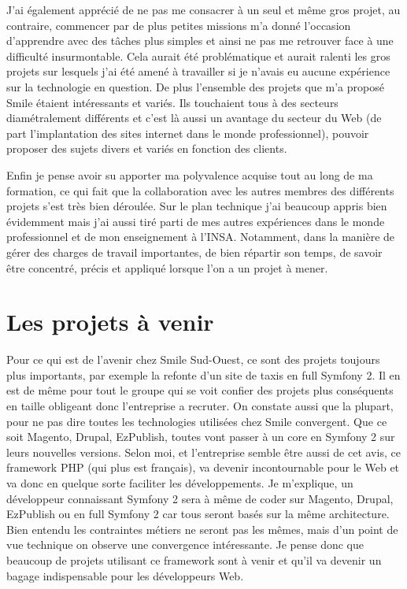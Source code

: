 \documentclass[a4paper,11pt,twoside]{report}
\begin{document}
  J'ai également apprécié de ne pas me consacrer à un seul et même gros projet, au contraire, commencer par de plus petites missions m'a donné l'occasion d'apprendre avec des tâches plus simples et ainsi ne pas me retrouver face à une difficulté insurmontable. Cela aurait été problématique et aurait ralenti les gros projets sur lesquels j'ai été amené à travailler si je n'avais eu aucune expérience sur la technologie en question. De plus l'ensemble des projets que m'a proposé Smile étaient intéressants et variés. Ils touchaient tous à des secteurs diamétralement différents et c'est là aussi un avantage du secteur du Web (de part l'implantation des sites internet dans le monde professionnel), pouvoir proposer des sujets divers et variés en fonction des clients.
  
  Enfin je pense avoir su apporter ma polyvalence acquise tout au long de ma formation, ce qui fait que la collaboration avec les autres membres des différents projets s'est très bien déroulée. Sur le plan technique j'ai beaucoup appris bien évidemment mais j'ai aussi tiré parti de mes autres expériences dans le monde professionnel et de mon enseignement à l'INSA. Notamment, dans la manière de gérer des charges de travail importantes, de bien répartir son temps, de savoir être concentré, précis et appliqué lorsque l'on a un projet à mener.
  \section*{Les projets à venir}
  Pour ce qui est de l'avenir chez Smile Sud-Ouest, ce sont des projets toujours plus importants, par exemple la refonte d'un site de taxis en full Symfony 2. Il en est de même pour tout le groupe qui se voit confier des projets plus conséquents en taille obligeant donc l'entreprise a recruter. On constate aussi que la plupart, pour ne pas dire toutes les technologies utilisées chez Smile convergent. Que ce soit Magento, Drupal, EzPublish, toutes vont passer à un core en Symfony 2 sur leurs nouvelles versions. Selon moi, et l'entreprise semble être aussi de cet avis, ce framework PHP (qui plus est français), va devenir incontournable pour le Web et va donc en quelque sorte faciliter les développements. Je m'explique, un développeur connaissant Symfony 2 sera à même de coder sur Magento, Drupal, EzPublish ou en full Symfony 2 car tous seront basés sur la même architecture. Bien entendu les contraintes métiers ne seront pas les mêmes, mais d'un point de vue technique on observe une convergence intéressante. Je pense donc que beaucoup de projets utilisant ce framework sont à venir et qu'il va devenir un bagage indispensable pour les développeurs Web.
  
\end{document}
